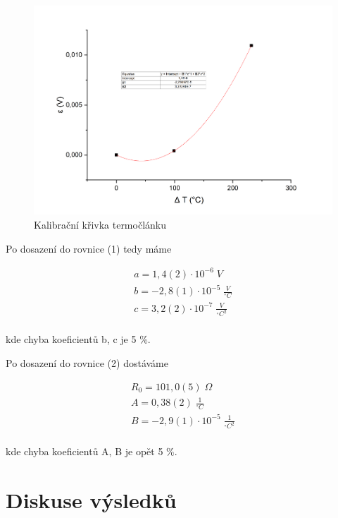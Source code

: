 \begin{figure}[h]
    \centering
    \includegraphics[width=0.8\linewidth]{8 - Kalibrace odporového teploměru a termočlánku//Prototkol - kalibrace teploměru//img/Závislost epsilon na delta T, parabola.png}
    \caption{Kalibrační křivka termočlánku}
    \label{fig:krivka-termoclanek}
\end{figure}

Po dosazení do rovnice (1) tedy máme

\begin{align*}
    a = 1,4(2) \cdot 10^{-6} \; V\\
    b = -2,8(1) \cdot 10^{-5} \; \frac{V}{^\circ C}\\
    c = 3,2(2) \cdot 10^{-7} \; \frac{V}{^\circ C^2} \\
\end{align*}

kde chyba koeficientů b, c je 5 \%.

Po dosazení do rovnice (2) dostáváme

\begin{align*}
    R_0 = 101,0(5) \; \Omega \\
    A = 0,38(2) \; \frac{1}{^\circ C} \\
    B = -2,9(1) \cdot 10^{-5} \; \frac{1}{^\circ C^2} \\
\end{align*}

kde chyba koeficientů A, B je opět 5 \%.

\newpage
\section{Diskuse výsledků}

